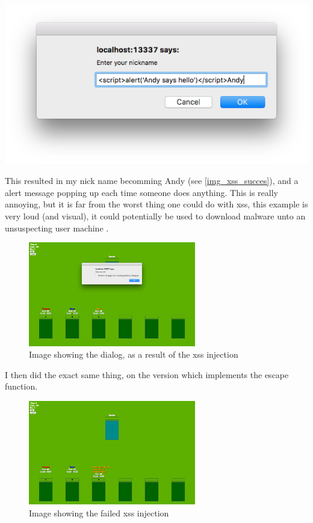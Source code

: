 \documentclass[a4paper]{article}
\begin{document}
\begin{center}
	\includegraphics[width=.5\textwidth]{images/xss_input}
\end{center}

This resulted in my nick name becomming Andy (see \autoref{img_xss_succes}), and a alert message popping up each time someone does anything. This is really annoying, but it is far from the worst thing one could do with xss, this example is very loud (and visual), it could potentially be used to download malware unto an unsuspecting user machine \cite{xss_consequences}.

\begin{figure}[H]
  \centering
  \includegraphics[width=0.65\textwidth]{images/xss_dialog}
  \caption{Image showing the dialog, as a result of the xss injection}
  \label{img_xss_succes}
\end{figure}


I then did the exact same thing, on the version which implements the escape function.

\begin{figure}[H]
  \centering
  \includegraphics[width=0.65\textwidth]{images/xss_prevented}
  \caption{Image showing the failed xss injection}
  \label{img_xss_fail}
\end{figure}
\end{document}
